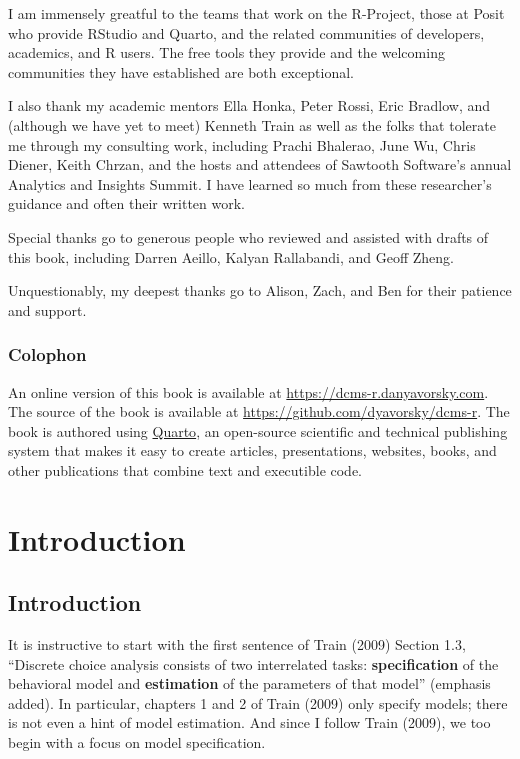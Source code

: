 \documentclass[
  letterpaper,
  DIV=11,
  numbers=noendperiod]{scrreprt}
\begin{document}

I am immensely greatful to the teams that work on the R-Project, those
at Posit who provide RStudio and Quarto, and the related communities of
developers, academics, and R users. The free tools they provide and the
welcoming communities they have established are both exceptional.

I also thank my academic mentors Ella Honka, Peter Rossi, Eric Bradlow,
and (although we have yet to meet) Kenneth Train as well as the folks
that tolerate me through my consulting work, including Prachi Bhalerao,
June Wu, Chris Diener, Keith Chrzan, and the hosts and attendees of
Sawtooth Software's annual Analytics and Insights Summit. I have learned
so much from these researcher's guidance and often their written work.

Special thanks go to generous people who reviewed and assisted with
drafts of this book, including Darren Aeillo, Kalyan Rallabandi, and
Geoff Zheng.

Unquestionably, my deepest thanks go to Alison, Zach, and Ben for their
patience and support.

\section*{Colophon}\label{colophon}


An online version of this book is available at
\url{https://dcms-r.danyavorsky.com}. The source of the book is
available at \url{https://github.com/dyavorsky/dcms-r}. The book is
authored using \href{https://quarto.org}{Quarto}, an open-source
scientific and technical publishing system that makes it easy to create
articles, presentations, websites, books, and other publications that
combine text and executible code.

\part{Introduction}

\chapter{Introduction}\label{sec-introduction}

It is instructive to start with the first sentence of Train (2009)
Section 1.3, ``Discrete choice analysis consists of two interrelated
tasks: \textbf{specification} of the behavioral model and
\textbf{estimation} of the parameters of that model'' (emphasis added).
In particular, chapters 1 and 2 of Train (2009) only specify models;
there is not even a hint of model estimation. And since I follow Train
(2009), we too begin with a focus on model specification.
\end{document}
